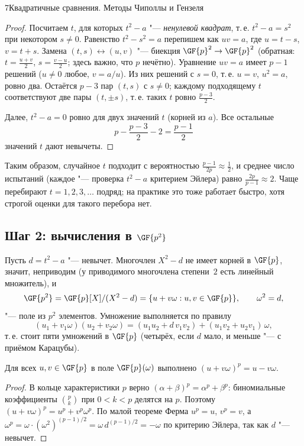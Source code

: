 \begin{lecture}{7}{Квадратичные сравнения. Методы Чиполлы и Гензеля}
\begin{proof}
Посчитаем $t$, для которых $t^2 - a$ "--- \emph{ненулевой квадрат}, т.\,е.
$t^2 - a = s^2$ при некотором $s \ne 0$. Равенство $t^2 - s^2 = a$ перепишем как $uv = a$, где
$u = t - s$, $v = t + s$. Замена $(t, s) \leftrightarrow (u, v)$ "--- биекция $\GF{p}^2 \to
\GF{p}^2$ (обратная: $t = \frac{u+v}{2}$, $s = \frac{v-u}{2}$; здесь важно, что $p$ нечётно).
Уравнение $uv = a$ имеет $p - 1$ решений ($u \ne 0$ любое, $v = a/u$). Из них решений с
$s = 0$, т.\,е. $u = v$, $u^2 = a$, ровно два. Остаётся $p - 3$ пар $(t, s)$ с $s \ne 0$;
каждому подходящему $t$ соответствуют две пары $(t, \pm s)$, т.\,е. таких $t$ ровно
$\frac{p-3}{2}$.

Далее, $t^2 - a = 0$ ровно для двух значений $t$ (корней из $a$). Все остальные
\[
  p - \frac{p-3}{2} - 2 = \frac{p - 1}{2}
\]
значений $t$ дают невычеты.
\end{proof}

Таким образом, случайное $t$ подходит с вероятностью $\frac{p-1}{2p} \approx \frac12$, и
среднее число испытаний (каждое "--- проверка $t^2 - a$ критерием Эйлера) равно
$\frac{2p}{p-1} \approx 2$. Чаще перебирают $t = 1, 2, 3, \dots$ подряд; на практике это тоже
работает быстро, хотя строгой оценки для такого перебора нет.

\subsection{\texorpdfstring{Шаг 2: вычисления в $\GF{p^2}$}{Шаг 2: вычисления в F(p\textasciicircum 2)}}

Пусть $d = t^2 - a$ "--- невычет. Многочлен $X^2 - d$ не имеет корней в $\GF{p}$, значит,
неприводим (у приводимого многочлена степени~$2$ есть линейный множитель), и
\[
  \GF{p^2} = \GF{p}[X]/(X^2 - d) = \{u + v\omega : u, v \in \GF{p}\}, \qquad \omega^2 = d,
\]
"--- поле из $p^2$ элементов.
Умножение выполняется по правилу
\[
  (u_1 + v_1\omega)(u_2 + v_2\omega) = (u_1u_2 + d\,v_1v_2) + (u_1v_2 + u_2v_1)\,\omega,
\]
т.\,е. стоит пяти умножений в $\GF{p}$ (четырёх, если $d$ мало, и меньше "--- с приёмом
Карацубы).

\begin{lemma}\label{l7:frob}
Для всех $u, v \in \GF{p}$ в поле $\GF{p}(\omega)$ выполнено $(u + v\omega)^p = u - v\omega$.
\end{lemma}

\begin{proof}
В кольце характеристики $p$ верно $(\alpha + \beta)^p = \alpha^p + \beta^p$: биномиальные
коэффициенты $\binom{p}{k}$ при $0 < k < p$ делятся на $p$. Поэтому
$(u + v\omega)^p = u^p + v^p \omega^p$. По малой теореме Ферма $u^p = u$, $v^p = v$, а
$\omega^p = \omega \cdot (\omega^2)^{(p-1)/2} = \omega\, d^{(p-1)/2} = -\omega$ по критерию
Эйлера, так как $d$ "--- невычет.
\end{proof}


\end{lecture}
